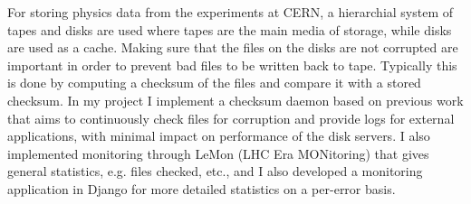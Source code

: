 \abstract
For storing physics data from the experiments at CERN, a hierarchial system of tapes and disks are used where tapes are the main media of storage, while disks are used as a cache. Making sure that the files on the disks are not corrupted are important in order to prevent bad files to be written back to tape. Typically this is done by computing a checksum of the files and compare it with a stored checksum. In my project I implement a checksum daemon based on previous work that aims to continuously check files for corruption and provide logs for external applications, with minimal impact on performance of the disk servers. I also implemented monitoring through LeMon (LHC Era MONitoring) that gives general statistics, e.g. files checked, etc., and I also developed a monitoring application in Django for more detailed statistics on a per-error basis.
